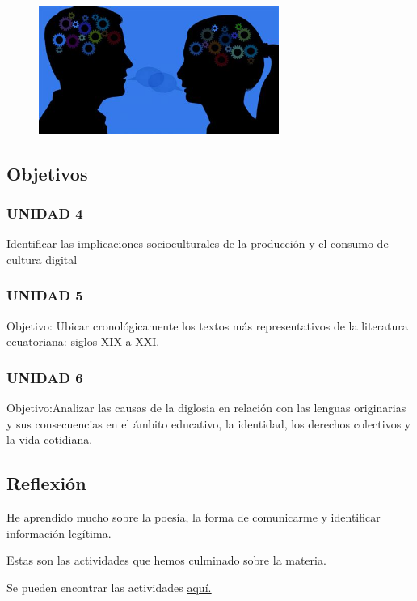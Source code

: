 \documentclass[a4paper, 12pt]{article}
\begin{document}
\begin{figure}[h]
  \includegraphics[width=0.7\textwidth, center]{lenguaje.jpeg}
\end{figure}

\subsection{Objetivos}
\subsubsection{UNIDAD 4}

Identificar las implicaciones socioculturales de la producción y el consumo de cultura digital

\subsubsection{UNIDAD 5}

Objetivo: Ubicar cronológicamente los textos más representativos de la literatura ecuatoriana: siglos XIX  a XXI.

\subsubsection{UNIDAD 6}

Objetivo:Analizar las causas de la diglosia en relación con las lenguas originarias y sus consecuencias en el ámbito educativo, la identidad, los derechos colectivos y la vida cotidiana.

\subsection{Reflexión}
He aprendido mucho sobre la poesía, la forma de comunicarme y identificar información legítima.

Estas son las actividades que hemos culminado sobre la materia.

Se pueden encontrar las actividades \href{https://drive.google.com/drive/folders/1Yzkl5f3mAak-WTCwdcppPKqvAjG_teDC?usp=sharing}{\underline{aquí.}}
\end{document}
